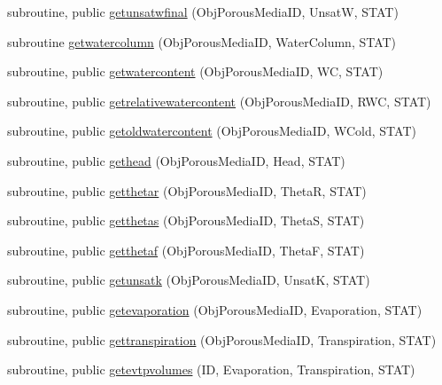 \begin{DoxyCompactItemize}
\item 
subroutine, public \mbox{\hyperlink{namespacemoduleporousmedia_a3fedd853f5701a32fbd7def6581fa30f}{getunsatwfinal}} (Obj\+Porous\+Media\+ID, UnsatW, S\+T\+AT)
\item 
subroutine \mbox{\hyperlink{namespacemoduleporousmedia_a9423063423e189eb443c264d3302f41d}{getwatercolumn}} (Obj\+Porous\+Media\+ID, Water\+Column, S\+T\+AT)
\item 
subroutine, public \mbox{\hyperlink{namespacemoduleporousmedia_a5b9d7f2adce9fea213bdc41bdb432a9f}{getwatercontent}} (Obj\+Porous\+Media\+ID, WC, S\+T\+AT)
\item 
subroutine, public \mbox{\hyperlink{namespacemoduleporousmedia_a97c2a20bb7ae4ddffb2c0f4d7586412a}{getrelativewatercontent}} (Obj\+Porous\+Media\+ID, R\+WC, S\+T\+AT)
\item 
subroutine, public \mbox{\hyperlink{namespacemoduleporousmedia_a2b7e324655161146b0aaf1af3e684670}{getoldwatercontent}} (Obj\+Porous\+Media\+ID, W\+Cold, S\+T\+AT)
\item 
subroutine, public \mbox{\hyperlink{namespacemoduleporousmedia_a19324728630ae49f29d577f63d3f8523}{gethead}} (Obj\+Porous\+Media\+ID, Head, S\+T\+AT)
\item 
subroutine, public \mbox{\hyperlink{namespacemoduleporousmedia_a40c5d4f62420edfa4bfd5f6ec20d6eda}{getthetar}} (Obj\+Porous\+Media\+ID, ThetaR, S\+T\+AT)
\item 
subroutine, public \mbox{\hyperlink{namespacemoduleporousmedia_a13998a8a43bd8d705b0fbcf88cee6f50}{getthetas}} (Obj\+Porous\+Media\+ID, ThetaS, S\+T\+AT)
\item 
subroutine, public \mbox{\hyperlink{namespacemoduleporousmedia_a80332ae529e97e277c38798d15633046}{getthetaf}} (Obj\+Porous\+Media\+ID, ThetaF, S\+T\+AT)
\item 
subroutine, public \mbox{\hyperlink{namespacemoduleporousmedia_a8bdcde0305ffa37c3f25774f880927af}{getunsatk}} (Obj\+Porous\+Media\+ID, UnsatK, S\+T\+AT)
\item 
subroutine, public \mbox{\hyperlink{namespacemoduleporousmedia_a03d64458de86e4672fab26f2e74233b8}{getevaporation}} (Obj\+Porous\+Media\+ID, Evaporation, S\+T\+AT)
\item 
subroutine, public \mbox{\hyperlink{namespacemoduleporousmedia_ad069d36e784e065b5145cf9e5a29e786}{gettranspiration}} (Obj\+Porous\+Media\+ID, Transpiration, S\+T\+AT)
\item 
subroutine, public \mbox{\hyperlink{namespacemoduleporousmedia_ac5c8b09a721ba8f3b2b3610d90098651}{getevtpvolumes}} (ID, Evaporation, Transpiration, S\+T\+AT)

\end{DoxyCompactItemize}

